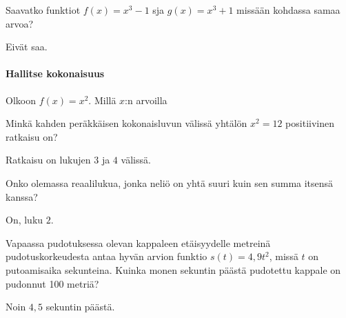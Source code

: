 \begin{tehtavasivu}
\begin{tehtava}
Saavatko funktiot $ f(x)=x^{3}-1$ sja $ g(x)=x^{3}+1$ missään kohdassa samaa arvoa?
\begin{vastaus}
Eivät saa.
\end{vastaus}
\end{tehtava}

\paragraph*{Hallitse kokonaisuus}

\begin{tehtava}
Olkoon $f(x)=x^2$. Millä $x$:n arvoilla
\begin{alakohdat}
\end{alakohdat}
\begin{vastaus}
\begin{alakohdat}
\end{alakohdat}
\end{vastaus}
\end{tehtava}

\begin{tehtava}
Minkä kahden peräkkäisen kokonaisluvun välissä yhtälön $x^2 = 12$ positiivinen ratkaisu on?
\begin{vastaus}
Ratkaisu on lukujen $3$ ja $4$ välissä.
\end{vastaus}
\end{tehtava}

\begin{tehtava}
Onko olemassa reaalilukua, jonka neliö on yhtä suuri kuin sen summa itsensä kanssa?
\begin{vastaus}
On, luku $ 2 $.
\end{vastaus}
\end{tehtava}


\begin{tehtava}
Vapaassa pudotuksessa olevan kappaleen etäisyydelle metreinä pudotuskorkeudesta antaa hyvän arvion funktio $ s(t)=4,9t^{2}$, missä $ t $ on putoamisaika sekunteina. Kuinka monen sekuntin päästä pudotettu kappale on pudonnut 100 metriä?
\begin{vastaus}
Noin $4,5$ sekuntin päästä.
\end{vastaus}
\end{tehtava}


\end{tehtavasivu}
